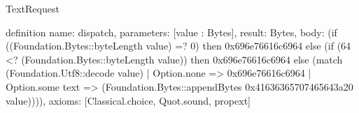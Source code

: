 \begin{lexlean}{TextRequest}
\begin{semanticmodule}
definition{
  name: dispatch,
  parameters: [value : Bytes],
  result: Bytes,
  body: (if ((Foundation.Bytes::byteLength value) =? 0) then 0x696e76616c6964 else (if (64 <? (Foundation.Bytes::byteLength value)) then 0x696e76616c6964 else (match (Foundation.Utf8::decode value)
    | Option.none => 0x696e76616c6964
    | Option.some text => (Foundation.Bytes::appendBytes 0x41636365707465643a20 value)))),
  axioms: [Classical.choice, Quot.sound, propext]
}
\end{semanticmodule}
\end{lexlean}
